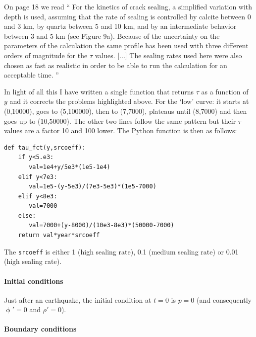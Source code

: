 On page 18 we read ``
For the kinetics of crack sealing, a simplified
variation with depth is used, assuming that the rate of
sealing is controlled by calcite between 0 and 3 km, by
quartz between 5 and 10 km, and by an intermediate
behavior between 3 and 5 km (see Figure 9a). Because of
the uncertainty on the parameters of the calculation the same
profile has been used with three different orders of magnitude 
for the $\tau$ values.
[...] The sealing rates used here were also chosen as fast
as realistic in order to be able to run the calculation for an
acceptable time.
''

In light of all this I have written a single function that returns $\tau$ as a function of $y$
and it corrects the problems highlighted above. 
For the `low' curve: it starts at (0,10000), goes to (5,100000), then to (7,7000), plateaus
until (8,7000) and then goes up to (10,50000).
The other two lines follow the same pattern but their $\tau$ values are a factor 10 and 100 lower.
The Python function is then as follows:
\begin{lstlisting}
def tau_fct(y,srcoeff):
    if y<5.e3:
       val=1e4+y/5e3*(1e5-1e4)
    elif y<7e3:
       val=1e5-(y-5e3)/(7e3-5e3)*(1e5-7000)
    elif y<8e3:
       val=7000
    else:
       val=7000+(y-8000)/(10e3-8e3)*(50000-7000)
    return val*year*srcoeff
\end{lstlisting}
The \lstinline{srcoeff} is either 1 (high sealing rate), 0.1 (medium sealing rate)
or 0.01 (high sealing rate).


\paragraph{Initial conditions}

Just after an earthquake, the initial condition at $t=0$ is $p=0$ (and consequently 
$\upphi'=0$  and $\rho'=0$).

\paragraph{Boundary conditions}

